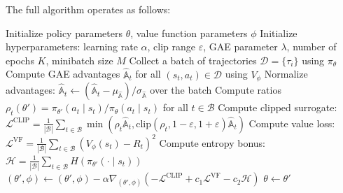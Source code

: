 \documentclass[11pt, letterpaper]{article}
\begin{document}
\begin{concept}
    The full algorithm operates as follows: 
    \begin{algorithm}[H]
    \caption*{PPO-Clip Algorithm}
    \begin{algorithmic}[1]
    \State Initialize policy parameters \(\theta\), value function parameters \(\phi\)
    \State Initialize hyperparameters: learning rate \(\alpha\), clip range \(\varepsilon\), GAE parameter \(\lambda\), number of epochs \(K\), minibatch size \(M\)
        \State Collect a batch of trajectories \(\mathcal{D} = \{\tau_i\}\) using \(\pi_\theta\) 
        \State Compute GAE advantages \(\widehat{\mathbb{A}}_t\) for all \((s_t, a_t) \in \mathcal{D}\) using \(V_\phi\)
        \State Normalize advantages: \(\widehat{\mathbb{A}}_t \leftarrow (\widehat{\mathbb{A}}_t - \mu_{\widehat{\mathbb{A}}}) / \sigma_{\widehat{\mathbb{A}}}\) over the batch
                \State Compute ratios \(\rho_t(\theta') = \pi_{\theta'}(a_t \mid s_t) / \pi_\theta(a_t \mid s_t)\) for all \(t \in \mathcal{B}\) 
                \State Compute clipped surrogate: \(\mathcal{L}^{\text{CLIP}} = \frac{1}{|\mathcal{B}|}\sum_{t \in \mathcal{B}} \min(\rho_t \widehat{\mathbb{A}}_t, \text{clip}(\rho_t, 1{-}\varepsilon, 1{+}\varepsilon)\widehat{\mathbb{A}}_t)\) 
                \State Compute value loss: \(\mathcal{L}^{\text{VF}} = \frac{1}{|\mathcal{B}|}\sum_{t \in \mathcal{B}} (V_\phi(s_t) - R_t)^2\)
                \State Compute entropy bonus: \(\mathcal{H} = \frac{1}{|\mathcal{B}|}\sum_{t \in \mathcal{B}} H(\pi_{\theta'}(\cdot \mid s_t))\)
                \State \((\theta', \phi) \leftarrow (\theta', \phi) - \alpha \nabla_{(\theta', \phi)} (-\mathcal{L}^{\text{CLIP}} + c_1 \mathcal{L}^{\text{VF}} - c_2 \mathcal{H})\)
            \EndFor
        \EndFor
        \State \(\theta \leftarrow \theta'\)
    \EndFor
    \end{algorithmic}
    \end{algorithm}
\end{concept}
\end{document}
